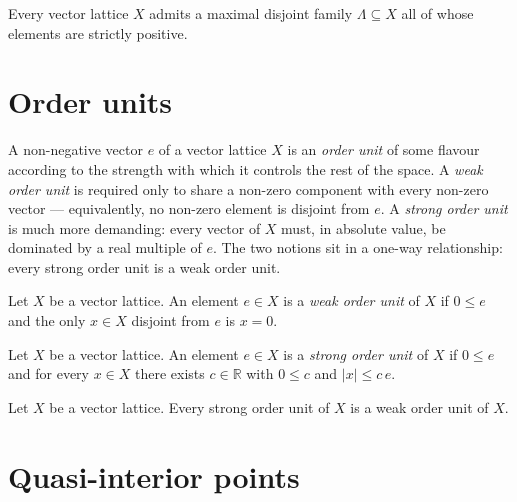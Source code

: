 \begin{theorem}
\label{thm:exists-isMaximalDisjoint-pos}
\leanok
{}
Every vector lattice $X$ admits a maximal disjoint family $\Lambda
\subseteq X$ all of whose elements are strictly positive.
\end{theorem}

\section{Order units}

A non-negative vector $e$ of a vector lattice $X$ is an \emph{order unit} of
some flavour according to the strength with which it controls the rest of the
space. A \emph{weak order unit} is required only to share a non-zero
component with every non-zero vector — equivalently, no non-zero element is
disjoint from $e$. A \emph{strong order unit} is much more demanding: every
vector of $X$ must, in absolute value, be dominated by a real multiple of $e$.
The two notions sit in a one-way relationship: every strong order unit is a
weak order unit.

\begin{definition}
\label{def:weakOrderUnit}
\leanok
{}
Let $X$ be a vector lattice. An element $e \in X$ is a \emph{weak order
unit} of $X$ if $0 \le e$ and the only $x \in X$ disjoint from $e$ is
$x = 0$.
\end{definition}

\begin{definition}
\label{def:strongOrderUnit}
\leanok
{}
Let $X$ be a vector lattice. An element $e \in X$ is a \emph{strong order
unit} of $X$ if $0 \le e$ and for every $x \in X$ there exists
$c \in \mathbb{R}$ with $0 \le c$ and $\lvert x \rvert \le c\,e$.
\end{definition}

\begin{theorem}
\label{thm:weakOrderUnit-of-strongOrderUnit}
\leanok
{}
Let $X$ be a vector lattice. Every strong order unit of $X$ is a weak
order unit of $X$.
\end{theorem}

\section{Quasi-interior points}

